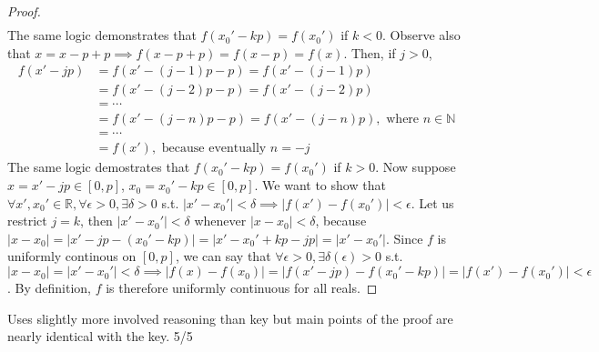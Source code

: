 \documentclass{article}
\begin{document}
\begin{enumerate}
\begin{proof}
\begin{align*}
      \end{align*}
      The same logic demonstrates that $f(x_0' - kp) = f(x_0')$ if $k < 0$.
      Observe also that $x = x - p + p \implies f(x - p + p) = f(x - p) = f(x)$.
      Then, if $j > 0$,
      \begin{align*}
        f(x' - jp) &= f(x' - (j - 1)p - p) = f(x' - (j - 1)p)\\
        &= f(x' - (j - 2)p - p) = f(x' - (j - 2)p)\\
        &= \cdots\\
        &= f(x' - (j - n)p - p) = f(x' - (j - n)p), \text{ where $n \in \mathbb{N}$}\\
        &= \cdots\\
        &= f(x'), \text{ because eventually $n = -j$}
      \end{align*}
      The same logic demostrates that $f(x_0' - kp) = f(x_0')$ if $k > 0$.
      Now suppose $x = x' - jp \in [0, p]$,
      $x_0 = x_0' - kp \in [0, p]$.
      We want to show that $\forall x', x_0' \in \mathbb{R}, \forall \epsilon > 0,
      \exists \delta >0$ s.t. $|x'-x_0'| < \delta \implies |f(x')-f(x_0')| < \epsilon$.
      Let us restrict $j=k$, then $|x' - x_0'| < \delta$ whenever
      $|x - x_0| < \delta$, because $|x - x_0| = |x' - jp - (x_0' - kp)| = 
      |x' - x_0' + kp - jp| = |x' - x_0'|$.
      Since $f$ is uniformly continous on $[0, p]$,
      we can say that $\forall \epsilon > 0, \exists \delta(\epsilon) > 0$
      s.t. $|x - x_0| = |x' - x_0'| < \delta \implies |f(x) - f(x_0)| = 
      |f(x' - jp) - f(x_0' - kp)| = |f(x') - f(x_0')| < \epsilon$.
      By definition, $f$ is therefore uniformly continuous for all reals.
      
    \end{proof}

    \color{Red}
    Uses slightly more involved reasoning than key but main 
    points of the proof are nearly identical with the key. 5/5
    \color{Black}


\end{enumerate}
\end{document}
